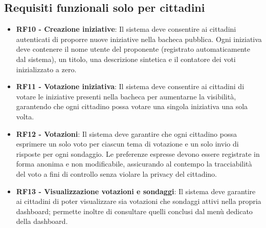 \documentclass{article}
\begin{document}
\subsection{Requisiti funzionali solo per cittadini}
\begin{itemize}
	\item \textbf{RF10 - Creazione iniziative}: Il sistema deve consentire ai cittadini autenticati di proporre nuove iniziative nella bacheca pubblica. Ogni iniziativa deve contenere il nome utente del proponente (registrato automaticamente dal sistema), un titolo, una descrizione sintetica e il contatore dei voti inizializzato a zero.
	\item \textbf{RF11 - Votazione iniziativa}: Il sistema deve consentire ai cittadini di votare le iniziative presenti nella bacheca per aumentarne la visibilità, garantendo che ogni cittadino possa votare una singola iniziativa una sola volta.
	\item \textbf{RF12 - Votazioni}: Il sistema deve garantire che ogni cittadino possa esprimere un solo voto per ciascun tema di votazione e un solo invio di risposte per ogni sondaggio. Le preferenze espresse devono essere registrate in forma anonima e non modificabile, assicurando al contempo la tracciabilità del voto a fini di controllo senza violare la privacy del cittadino.
	\item \textbf{RF13 - Visualizzazione votazioni e sondaggi}: Il sistema deve garantire ai cittadini di poter visualizzare sia votazioni che sondaggi attivi nella propria dashboard; permette inoltre di consultare quelli conclusi dal menù dedicato della dashboard.
\end{itemize}
\end{document}
